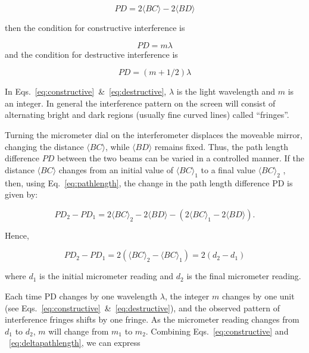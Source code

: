 \begin{equation}
PD = 2\langle BC\rangle - 2\langle BD\rangle 
\label{eq:pathlength}
\end{equation}

then the condition for constructive interference is 

\begin{equation}
 PD = m\lambda
\label{eq:constructive}
\end{equation}
and the condition for destructive interference is

\begin{equation}
PD = (m+1/2)\lambda
\label{eq:destructive}
\end{equation}

 In Eqs.~\ref{eq:constructive}~\&~\ref{eq:destructive}, $\lambda$ is the light wavelength and $m$ is 
an integer. In general the interference pattern on the screen 
will consist of alternating bright and dark regions (usually 
fine curved lines) called ``fringes''.

Turning the micrometer dial on the interferometer displaces the 
moveable mirror, changing the distance $\langle BC \rangle$, while $\langle BD\rangle $
remains fixed. Thus, the path length difference $PD$ between the 
two beams can be varied in a controlled manner. If the distance 
$\langle BC\rangle$ changes from an initial value of $\langle BC\rangle_{1}$ 
to a final value $\langle BC\rangle_{2}$ , then, using Eq.~\ref{eq:pathlength}, the change 
in the path length difference PD is given by:

\begin{equation}
 PD_2 - PD_{1} = 2\langle BC\rangle_{2} - 2\langle BD\rangle - (2\langle BC\rangle_{1} - 
2\langle BD\rangle).
\label{eq:deltapathlength}
\end{equation}


Hence,

\begin{equation}
PD_{2} - PD_{1} = 2(\langle BC\rangle_{2}  - \langle BC\rangle_{1}) = 2(d_{2} - 
d_{1})
\end{equation}

where $d_{1}$ is the initial micrometer reading and $d_{2}$ is the  final micrometer reading.

Each time PD changes by one wavelength $\lambda$, the integer $m$ changes
by one unit (see Eqs.~\ref{eq:constructive}~\&~\ref{eq:destructive}), and the observed pattern of interference
fringes shifts by one fringe. As the micrometer reading changes from
$d_{1}$ to $d_{2}$, $m$ will change from $m_{1}$ to $m_{2}$. Combining
Eqs.~\ref{eq:constructive} and ~\ref{eq:deltapathlength}, we can express

